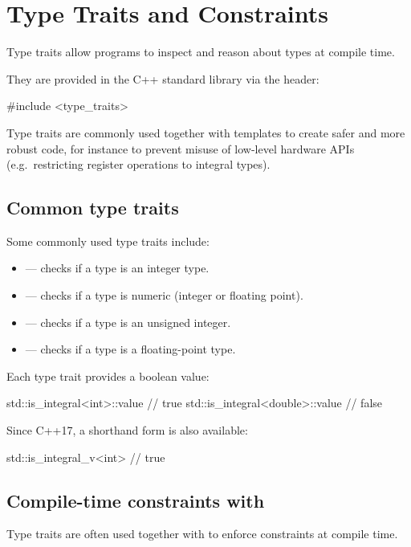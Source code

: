
\section{Type Traits and Constraints}
\label{c5:sec:traits}\label{c5:app:b}
Type traits allow programs to inspect and reason about types at compile time.

They are provided in the C++ standard library via the header:

\begin{cppcode}
#include <type_traits>
\end{cppcode}

\noindent Type traits are commonly used together with templates to create safer and more robust
code, for instance to prevent misuse of low-level hardware APIs (e.g.\ restricting register
operations to integral types).

\subsection{Common type traits}
\label{c5:sec:commontraits}
Some commonly used type traits include:
\begin{itemize}
  \item {} --- checks if a type is an integer type.
  \item {} --- checks if a type is numeric (integer or floating point).
  \item {} --- checks if a type is an unsigned integer.
  \item {} --- checks if a type is a floating-point type.
\end{itemize}
Each type trait provides a boolean value:

\begin{cppcode}
std::is_integral<int>::value     // true
std::is_integral<double>::value  // false
\end{cppcode}

\noindent Since C++17, a shorthand form is also available:

\begin{cppcode}
std::is_integral_v<int> // true
\end{cppcode}

\subsection{Compile-time constraints with }
\label{c5:sec:staticassert}
Type traits are often used together with  to enforce constraints at compile
time.

